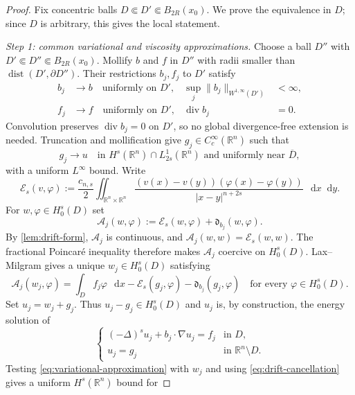 \documentclass[10pt,a4paper]{amsart}
\numberwithin{equation}{section}
\newcommand{\R}{\mathbb R}
\newcommand{\differential}{\mathop{}\!\mathrm d}
\DeclareMathOperator{\divergence}{div}
\begin{document}
\begin{proof}
Fix concentric balls $D\Subset D'\Subset B_{2R}(x_0)$.  We prove the
equivalence in $D$; since $D$ is arbitrary, this gives the local statement.

\smallskip
\noindent\emph{Step 1: common variational and viscosity approximations.}
\begingroup
Choose a ball $D''$ with
$D'\Subset D''\Subset B_{2R}(x_0)$.  Mollify $b$ and $f$ in $D''$ with
radii smaller than $\operatorname{dist}(D',\partial D'')$.  Their
restrictions $b_j,f_j$ to $D'$ satisfy
\begin{align*}
 b_j&\to b\quad\text{uniformly on }D',
 &\sup_j\|b_j\|_{W^{1,\infty}(D')}&<\infty,\\
 f_j&\to f\quad\text{uniformly on }D',
 &\divergence b_j&=0.
\end{align*}
Convolution preserves $\divergence b_j=0$ on $D'$, so no global
divergence-free extension is needed.  Truncation and mollification give
$g_j\in C_c^\infty(\R^n)$ such that
\[
 g_j\to u\quad\text{in }H^s(\R^n)\cap L^1_{2s}(\R^n)
 \text{ and uniformly near }\overline D,
\]
with a uniform $L^\infty$ bound.  Write
\[
 \mathcal E_s(v,\varphi):=\frac{c_{n,s}}2
 \iint_{\R^n\times\R^n}
 \frac{(v(x)-v(y))(\varphi(x)-\varphi(y))}
 {|x-y|^{n+2s}}\,\differential x\differential y.
\]
For $w,\varphi\in H_0^s(D)$ set
\[
 \mathcal A_j(w,\varphi)
 :=\mathcal E_s(w,\varphi)+\mathfrak d_{b_j}(w,\varphi).
\]
By \cref{lem:drift-form}, $\mathcal A_j$ is continuous, and
$\mathcal A_j(w,w)=\mathcal E_s(w,w)$.  The fractional Poincar\'e
inequality therefore makes $\mathcal A_j$ coercive on $H_0^s(D)$.
Lax--Milgram gives a unique $w_j\in H_0^s(D)$ satisfying
\begin{equation}\label{eq:variational-approximation}
 \mathcal A_j(w_j,\varphi)
 =\int_Df_j\varphi\,\differential x
  -\mathcal E_s(g_j,\varphi)-\mathfrak d_{b_j}(g_j,\varphi)
 \quad\text{for every }\varphi\in H_0^s(D).
\end{equation}
Set $u_j=w_j+g_j$.  Thus $u_j-g_j\in H_0^s(D)$ and $u_j$ is, by
construction, the energy solution of
\begin{equation}\label{eq:smooth-dirichlet-equivalence}
 \begin{cases}
 (-\Delta)^su_j+b_j\cdot\nabla u_j=f_j&\text{in }D,\\
 u_j=g_j&\text{in }\R^n\setminus D.
 \end{cases}
\end{equation}
Testing \eqref{eq:variational-approximation} with $w_j$ and using
\eqref{eq:drift-cancellation} gives a uniform $H^s(\R^n)$ bound for

\end{proof}
\end{document}
